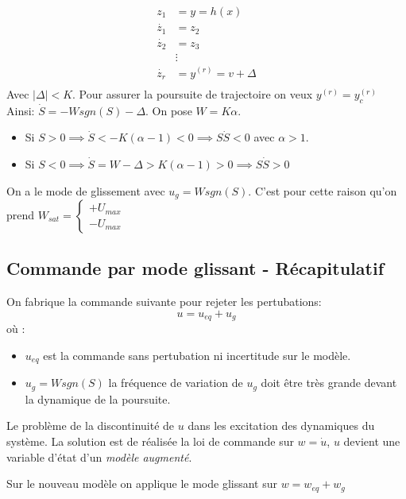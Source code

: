 \documentclass[main.tex]{subfiles}
\begin{document}
\begin{align*}
  z_1 &= y = h(x) \\
  \dot{z_1} &= z_2 \\
 \dot{z_2} &= z_3 \\
           & \vdots \\
 \dot{z_r} &= y^{(r)} = v + \Delta  \\
\end{align*}
Avec $|\Delta| < K $. Pour assurer la poursuite de trajectoire on veux $ y^{(r)}=y_c^{(r)}$ Ainsi: $\dot{S} = - W sgn(S) -\Delta$. On pose $W = K \alpha$.
\begin{itemize}
\item Si $S > 0 \implies \dot{S} < -K (\alpha-1) < 0 \implies S\dot{S} <0 $ avec $\alpha >1$.
\item Si $S<0 \implies \dot{S} = W - \Delta > K(\alpha-1) >0 \implies S\dot{S} > 0 $
\end{itemize}


On a le mode de glissement avec $u_g = W sgn(S) $. C'est pour cette raison qu'on prend $W_{sat} =
\begin{cases}
  +U_{max}\\
  -U_{max}
\end{cases}
$
\subsection{Commande par mode glissant - Récapitulatif}

On fabrique la commande suivante pour rejeter les pertubations:
\[
  u = u_{eq} + u_g 
\]
où : 
\begin{itemize}
\item  $u_{eq}$ est la commande sans pertubation ni incertitude sur le modèle.
\item $u_g = W sgn(S)$  la fréquence de variation de $u_g$ doit être  très grande devant la dynamique de la poursuite.
\end{itemize}

Le problème de la discontinuité de $u$ dans les excitation des dynamiques du système. La solution est de réalisée la loi de commande sur $w= \dot{u}$, $u$ devient une variable d'état d'un\emph{ modèle augmenté}.

Sur le nouveau modèle on applique le mode glissant sur $w = w_{eq}+ w_g$
\end{document}
